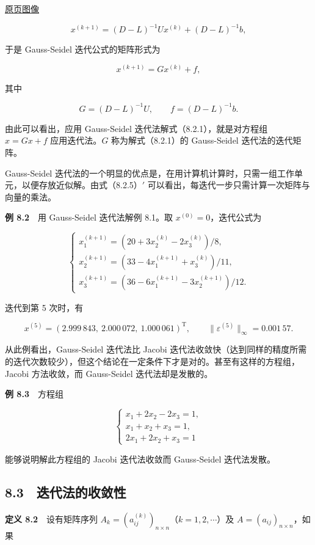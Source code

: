 \documentclass[
  10pt,
  fontset=fandol]{ctexart}
\begin{document}
\href{../../source-images/pdf-219.jpeg}{原页图像}

\[
x^{(k+1)}=(D-L)^{-1}Ux^{(k)}+(D-L)^{-1}b,
\]

于是 Gauss-Seidel 迭代公式的矩阵形式为

\[
x^{(k+1)}=Gx^{(k)}+f,
\tag{8.2.6}
\]

其中

\[
G=(D-L)^{-1}U,\qquad f=(D-L)^{-1}b.
\]

由此可以看出，应用 Gauss-Seidel 迭代法解式（8.2.1），就是对方程组 \(x=Gx+f\) 应用迭代法。\(G\) 称为解式（8.2.1）的 Gauss-Seidel 迭代法的迭代矩阵。

Gauss-Seidel 迭代法的一个明显的优点是，在用计算机计算时，只需一组工作单元，以便存放近似解。由式（8.2.5）\('\) 可以看出，每迭代一步只需计算一次矩阵与向量的乘法。

\textbf{例 8.2}　用 Gauss-Seidel 迭代法解例 8.1。取 \(x^{(0)}=0\)，迭代公式为

\[
\begin{cases}
x_1^{(k+1)}=(20+3x_2^{(k)}-2x_3^{(k)})/8,\\
x_2^{(k+1)}=(33-4x_1^{(k+1)}+x_3^{(k)})/11,\\
x_3^{(k+1)}=(36-6x_1^{(k+1)}-3x_2^{(k+1)})/12.
\end{cases}
\]

迭代到第 5 次时，有

\[
x^{(5)}=(2.999\,843,\ 2.000\,072,\ 1.000\,061)^{\mathrm T},\qquad
\|\varepsilon^{(5)}\|_\infty=0.001\,57.
\]

从此例看出，Gauss-Seidel 迭代法比 Jacobi 迭代法收敛快（达到同样的精度所需的迭代次数较少），但这个结论在一定条件下才是对的。甚至有这样的方程组，Jacobi 方法收敛，而 Gauss-Seidel 迭代法却是发散的。

\textbf{例 8.3}　方程组

\[
\begin{cases}
x_1+2x_2-2x_3=1,\\
x_1+x_2+x_3=1,\\
2x_1+2x_2+x_3=1
\end{cases}
\]

能够说明解此方程组的 Jacobi 迭代法收敛而 Gauss-Seidel 迭代法发散。

\subsection{8.3　迭代法的收敛性}\label{ux8fedux4ee3ux6cd5ux7684ux6536ux655bux6027}

\textbf{定义 8.2}　设有矩阵序列 \(A_k=(a_{ij}^{(k)})_{n\times n}\)（\(k=1,2,\cdots\)）及 \(A=(a_{ij})_{n\times n}\)，如果
\end{document}
